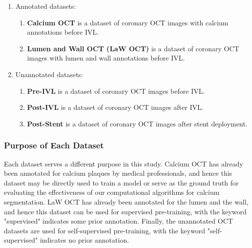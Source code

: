 \documentclass[a4paper,11pt,oneside]{report}
\begin{document}
\begin{enumerate}
    \item Annotated datasets:
    \begin{enumerate}
        \item \label{enum:calcium-dataset} \textbf{Calcium OCT} is a dataset of coronary OCT images with calcium annotations before IVL.
        \item \label{enum:lumen-and-wall-dataset} \textbf{Lumen and Wall OCT (LaW OCT)} is a dataset of coronary OCT images with lumen and wall annotations before IVL.
    \end{enumerate}
    \item \label{enum:unannotated-dataset} Unannotated datasets:
    \begin{enumerate}
        \item \textbf{Pre-IVL} is a dataset of coronary OCT images before IVL.
        \item \textbf{Post-IVL} is a dataset of coronary OCT images after IVL.
        \item \textbf{Post-Stent} is a dataset of coronary OCT images after stent deployment.
    \end{enumerate}
\end{enumerate}

\subsubsection{Purpose of Each Dataset}

Each dataset serves a different purpose in this study. Calcium OCT has already been annotated for calcium plaques by medical professionals, and hence this dataset may be directly used to train a model or serve as the ground truth for evaluating the effectiveness of our computational algorithms for calcium segmentation. LaW OCT has already been annotated for the lumen and the wall, and hence this dataset can be used for supervised pre-training, with the keyword "supervised" indicates some prior annotation. Finally, the unannotated OCT datasets are used for self-supervised pre-training, with the keyword "self-supervised" indicates no prior annotation. 
\end{document}
